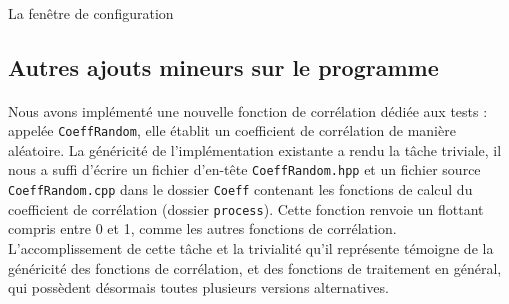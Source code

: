 \paragraph{}
La fenêtre de configuration%

\subsection{Autres ajouts mineurs sur le programme}
\paragraph{}
Nous avons implémenté une nouvelle fonction de corrélation dédiée aux
tests : appelée \verb!CoeffRandom!, elle établit un coefficient de
corrélation de manière aléatoire. La généricité de l'implémentation
existante a rendu la tâche triviale, il nous a suffi d'écrire un
fichier d'en-tête \verb!CoeffRandom.hpp! et un fichier source
\verb!CoeffRandom.cpp! dans le dossier \verb!Coeff! contenant les
fonctions de calcul du coefficient de corrélation (dossier
\verb!process!). Cette fonction renvoie un flottant compris entre 0 et
1, comme les autres fonctions de corrélation. L'accomplissement de
cette tâche et la trivialité qu'il représente témoigne de la
généricité des fonctions de corrélation, et des fonctions de
traitement en général, qui possèdent désormais toutes plusieurs
versions alternatives.
